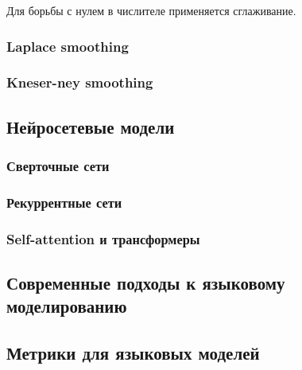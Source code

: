 Для борьбы с нулем в числителе применяется сглаживание. 

\subsubsection{Laplace smoothing}

\subsubsection{Kneser-ney smoothing}


\subsection{Нейросетевые модели}
\label{sub:domain:neural}



\subsubsection{Сверточные сети}

\subsubsection{Рекуррентные сети}

\subsubsection{Self-attention и трансформеры}

\subsection{Современные подходы к языковому моделированию}
\label{sub:domain:curr}

\subsection{Метрики для языковых моделей}



